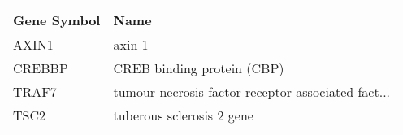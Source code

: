 \begin{tabular}{ll}
\toprule
Gene Symbol &                                               Name \\
\midrule
      AXIN1 &                                             axin 1 \\
     CREBBP &                         CREB binding protein (CBP) \\
      TRAF7 & tumour necrosis factor receptor-associated fact... \\
       TSC2 &                          tuberous sclerosis 2 gene \\
\bottomrule
\end{tabular}
